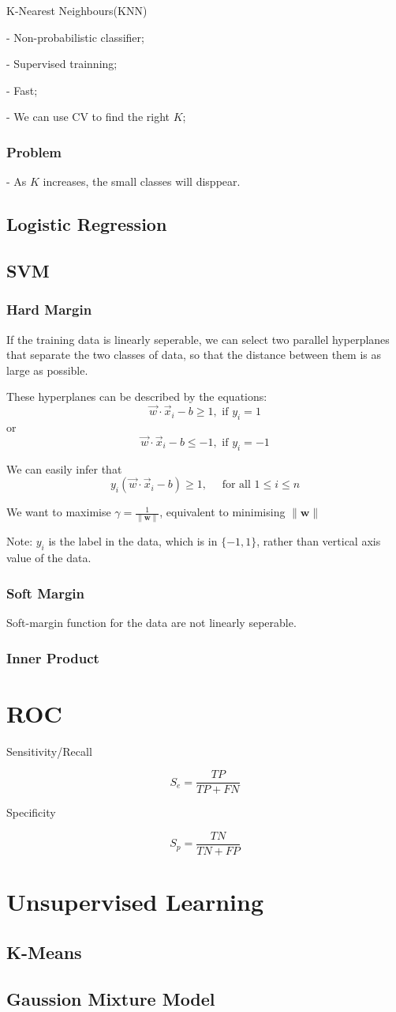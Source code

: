 \documentclass[12pt]{article}
\begin{document}
K-Nearest Neighbours(KNN)

- Non-probabilistic classifier;

- Supervised trainning;

- Fast;

- We can use CV to find the right $K$;

\subsubsection{Problem}
- As $K$ increases, the small classes will disppear.

\subsection{Logistic Regression}

\subsection{SVM}
\subsubsection{Hard Margin}
If the training data is linearly seperable,
we can select two parallel hyperplanes that separate the two classes of data,
so that the distance between them is as large as possible.

These hyperplanes can be described by the equations:
$$
\vec{w} \cdot \vec{x}_{i}-b \geq 1, \text { if } y_{i}=1
$$
or
$$
\vec{w} \cdot \vec{x}_{i}-b \leq-1, \text { if } y_{i}=-1
$$

We can easily infer that 
$$
y_{i}\left(\vec{w} \cdot \vec{x}_{i}-b\right) \geq 1, \quad \text { for all } 1 \leq i \leq n
$$

We want to maximise $\gamma=\frac{1}{\|\mathbf{w}\|}$,
equivalent to minimising $\|\mathbf{w}\|$

Note: $y_i$ is the label in the data, which is in $\{-1, 1\}$,
rather than vertical axis value of the data.
\subsubsection{Soft Margin}
Soft-margin function for the data are not linearly seperable.

\subsubsection{Inner Product}

\section{ROC}
Sensitivity/Recall

$$
S_{e}=\frac{T P}{T P+F N}
$$

Specificity

$$
S_{p}=\frac{T N}{T N+F P}
$$

\section{Unsupervised Learning}
\subsection{K-Means}

\subsection{Gaussion Mixture Model}
\end{document}
